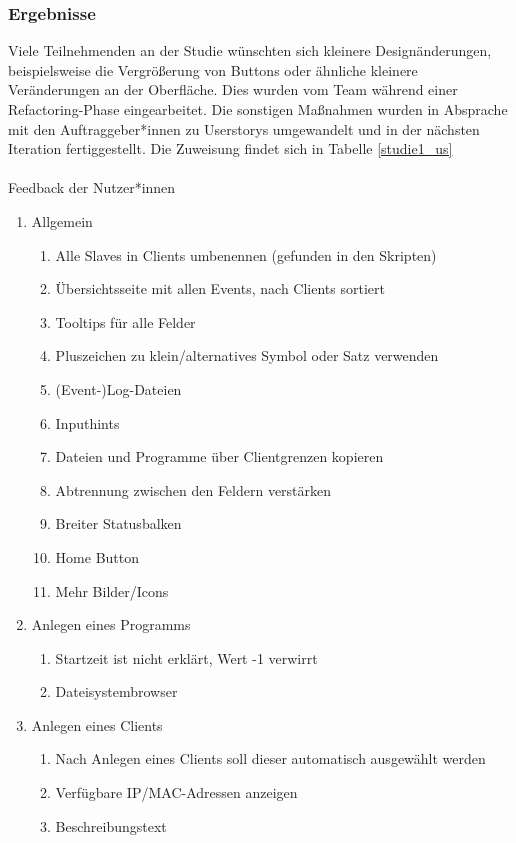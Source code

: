 \subsubsection{Ergebnisse}
Viele Teilnehmenden an der Studie wünschten sich kleinere Designänderungen, beispielsweise die Vergrößerung von
Buttons oder ähnliche kleinere Veränderungen an der Oberfläche. Dies wurden vom Team während einer Refactoring-Phase
eingearbeitet. Die sonstigen Maßnahmen wurden in Absprache mit den Auftraggeber*innen zu Userstorys umgewandelt und
in der nächsten Iteration fertiggestellt. Die Zuweisung findet sich in Tabelle \ref{studie1_us}
\\\\
{\large Feedback der Nutzer*innen\\}
\begin{enumerate}
\item Allgemein
\begin{enumerate}
	\item Alle Slaves in Clients umbenennen (gefunden in den Skripten)
	\item Übersichtsseite mit allen Events, nach Clients sortiert
	\item Tooltips für alle Felder
	\item Pluszeichen zu klein/alternatives Symbol oder Satz verwenden
	\item (Event-)Log-Dateien
	\item Inputhints
	\item Dateien und Programme über Clientgrenzen kopieren
	\item Abtrennung zwischen den Feldern verstärken
	\item Breiter Statusbalken
	\item Home Button
	\item Mehr Bilder/Icons
\end{enumerate}
\item Anlegen eines Programms
\begin{enumerate}
	\item Startzeit ist nicht erklärt, Wert -1 verwirrt
	\item Dateisystembrowser
\end{enumerate}
\item Anlegen eines Clients
\begin{enumerate}
	\item Nach Anlegen eines Clients soll dieser automatisch ausgewählt werden
	\item Verfügbare IP/MAC-Adressen anzeigen
	\item Beschreibungstext

\end{enumerate}
\end{enumerate}
